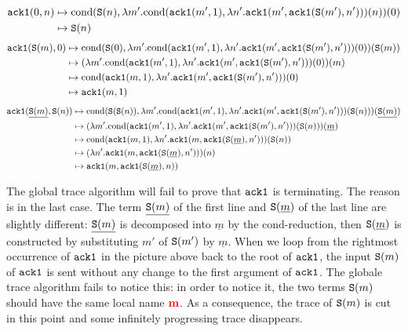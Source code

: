 \begin{align*}
  {\tt ack1}(0,n)
  &\mapsto
  \text{cond}({\tt S}(n),\lambda m'.\text{cond}({\tt ack1}(m',1),\lambda n'.{\tt ack1}(m',{\tt ack1}({\tt S}(m'),n')))(n))(0)
  \\
  &\mapsto
  {\tt S}(n)
\end{align*}
\begin{align*}
  {\tt ack1}({\tt S}(m),0)
  &\mapsto
  \text{cond}({\tt S}(0),\lambda m'.\text{cond}({\tt ack1}(m',1),\lambda n'.{\tt ack1}(m',{\tt ack1}({\tt S}(m'),n')))(0))({\tt S}(m))
  \\
  &\mapsto
  (\lambda m'.\text{cond}({\tt ack1}(m',1),\lambda n'.{\tt ack1}(m',{\tt ack1}({\tt S}(m'),n')))(0))(m)
  \\
  &\mapsto
  \text{cond}({\tt ack1}(m,1),\lambda n'.{\tt ack1}(m',{\tt ack1}({\tt S}(m'),n')))(0)
  \\
  &\mapsto
  {\tt ack1}(m,1)
\end{align*}
\begin{align*}
  {\tt ack1}(\underline{{\tt S}(m)},{\tt S}(n))
  &\mapsto
  \text{cond}({\tt S}({\tt S}(n)),\lambda m'.\text{cond}({\tt ack1}(m',1),\lambda n'.{\tt ack1}(m',{\tt ack1}({\tt S}(m'),n')))({\tt S}(n)))(\underline{{\tt S}(m)})
  \\
  &\mapsto
  (\lambda m'.\text{cond}({\tt ack1}(m',1),\lambda n'.{\tt ack1}(m',{\tt ack1}({\tt S}(m'),n')))({\tt S}(n)))(\underline{m})
  \\
  &\mapsto
  \text{cond}({\tt ack1}(m,1),\lambda n'.{\tt ack1}(m,{\tt ack1}({\tt S}(\underline{m}),n')))({\tt S}(n))
  \\
  &\mapsto
  (\lambda n'.{\tt ack1}(m,{\tt ack1}({\tt S}(\underline{m}),n')))(n)
  \\
  &\mapsto
  {\tt ack1}(m,{\tt ack1}({\tt S}(\underline{m}),n))
\end{align*}


The global trace algorithm will fail to prove that ${\tt ack1}$ is terminating. The reason is in the last case. 
The term $\underline{{\tt S}(m)}$ of the first line and ${\tt S}(\underline{m})$ of the last line are slightly 
different: $\underline{{\tt S}(m)}$ is decomposed into $\underline{m}$ by the $\text{cond}$-reduction, 
then ${\tt S}(\underline{m})$ is constructed by substituting $m'$ of ${\tt S}(m')$ by $\underline{m}$. 
When we loop from the rightmost occurrence of ${\tt ack1}$ 
in the picture above back to the root of ${\tt ack1}$, the input ${\tt S}(m)$ of ${\tt ack1}$ is sent without any change to the first argument of ${\tt ack1}$. The globale trace algorithm fails to notice this: 
in order to notice it, the two terms ${\tt S}(m)$ should have the same local name ${{\bf \color{red}{m}}}$.
As a consequence, the trace of ${\tt S}(m)$ is cut in this point and some infinitely progressing trace
disappears.



